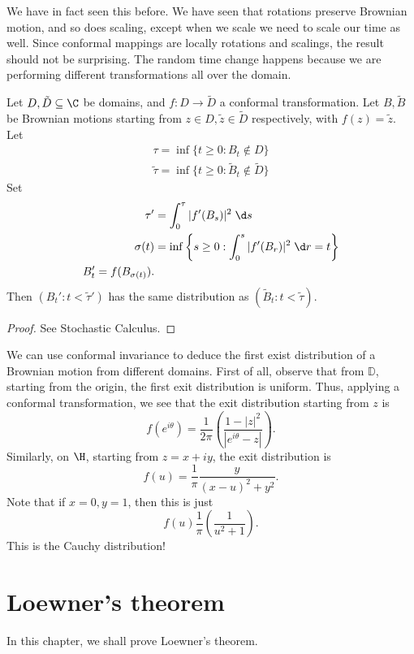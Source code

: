 \documentclass[a4paper]{article}
\renewcommand\D{\mathbb{D}}
\begin{document}
We have in fact seen this before. We have seen that rotations preserve Brownian motion, and so does scaling, except when we scale we need to scale our time as well. Since conformal mappings are locally rotations and scalings, the result should not be surprising. The random time change happens because we are performing different transformations all over the domain.

\begin{thm}
  Let $D, \tilde{D} \subseteq \C$ be domains, and $f: D \to \tilde{D}$ a conformal transformation. Let $B, \tilde{B}$ be Brownian motions starting from $z \in D, \tilde{z} \in \tilde{D}$ respectively, with $f(z) = \tilde{z}$. Let
  \begin{align*}
    \tau = \inf\{t \geq 0: B_t \not \in D\}\\
    \tilde{\tau} = \inf\{t \geq 0: \tilde{B}_t \not \in \tilde{D}\}
  \end{align*}
  Set
  \begin{align*}
    \tau' &= \int_0^\tau |f'(B_s)|^2\;\d s\\
    \sigma(t) &= \inf\left\{s \geq 0 : \int_0^s |f'(B_r)|^2\;\d r = t\right\}\\
    B_t' = f(B_{\sigma(t)}).
  \end{align*}
  Then $(B_t' : t < \tilde{\tau}')$ has the same distribution as $(\tilde{B}_t: t < \tilde{\tau})$.
\end{thm}

\begin{proof}
  See Stochastic Calculus.
\end{proof}

\begin{eg}
  We can use conformal invariance to deduce the first exist distribution of a Brownian motion from different domains. First of all, observe that from $\D$, starting from the origin, the first exit distribution is uniform. Thus, applying a conformal transformation, we see that the exit distribution starting from $z$ is
  \[
    f(e^{i\theta}) = \frac{1}{2\pi}\left(\frac{1 - |z|^2}{ |e^{i\theta} - z|}\right).
  \]
  Similarly, on $\H$, starting from $z = x + iy$, the exit distribution is
  \[
    f(u) = \frac{1}{\pi} \frac{y}{(x - u)^2 + y^2}.
  \]
  Note that if $x = 0, y = 1$, then this is just
  \[
    f(u) \frac{1}{\pi}\left(\frac{1}{u^2 + 1}\right).
  \]
  This is the Cauchy distribution!
\end{eg}

\section{Loewner's theorem}
In this chapter, we shall prove Loewner's theorem.
\end{document}
